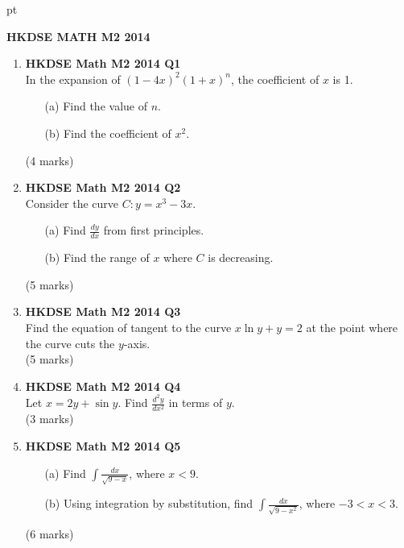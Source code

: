 \documentclass[12pt]{article}
\begin{document}
 pt
\begin{center}
	{\large \bf HKDSE MATH M2 2014}\\
	\vspace{2 mm}

\end{center}
\vspace{0.05cm}

\begin{enumerate}
	\item \textbf{HKDSE Math M2 2014 Q1}\\
	In the expansion of $(1-4x)^2(1+x)^n$, the coefficient of $x$ is 1.
	\begin{enumerate}
		\item [(a)]Find the value of $n$. 
		\item [(b)]Find the coefficient of $x^2$. 
	\end{enumerate}
	(4 marks)

	\item \textbf{HKDSE Math M2 2014 Q2}\\
	Consider the curve $C : y = x^3-3x$. 
	\begin{enumerate}
		\item [(a)]Find $\displaystyle\frac{dy}{dx}$ from first principles. 
		\item [(b)]Find the range of $x$ where $C$ is decreasing.
	\end{enumerate}
	(5 marks)

	\item \textbf{HKDSE Math M2 2014 Q3}\\
	Find the equation of tangent to the curve $x\ln{y} + y = 2$ at the point where the curve cuts the $y$-axis.\\
	(5 marks)

	\item \textbf{HKDSE Math M2 2014 Q4}\\
	Let $x = 2y + \sin{y}$. Find $\displaystyle\frac{d^2y}{dx^2}$ in terms of $y$.\\
	(3 marks)

	\item \textbf{HKDSE Math M2 2014 Q5}
	\begin{enumerate}
		\item [(a)]Find $\displaystyle\int \frac{dx}{\sqrt{9-x}}$, where $x < 9$. 
		\item [(b)]Using integration by substitution, find $\displaystyle\int \frac{dx}{\sqrt{9-x^2}}$, where $-3 < x < 3$.
	\end{enumerate}
	(6 marks)


\end{enumerate}
\end{document}

